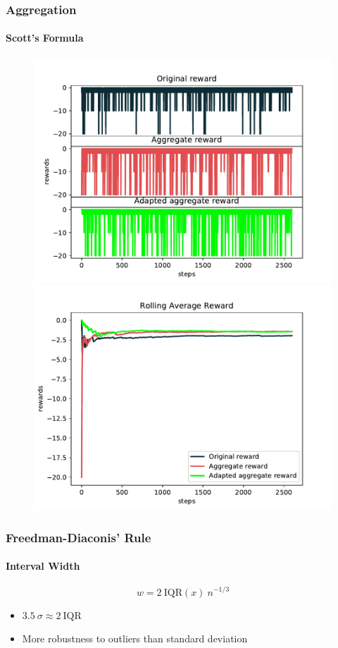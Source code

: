 \documentclass[mathserif]{beamer}
\begin{document}
    \begin{frame}
        \frametitle{Aggregation}
        \framesubtitle{Scott's Formula}

        \begin{figure}
            \label{fig:scott-rewards}
            \centering
            \includegraphics[width=0.46\columnwidth]{res/experiments/scott_steps_rewards.pdf}
            \qquad
            \includegraphics[width=0.46\columnwidth]{res/experiments/scott_rolling_rewards.pdf}
        \end{figure}

    \end{frame}


    \begin{frame}
        \frametitle{Freedman-Diaconis' Rule}
        \framesubtitle{Interval Width}

        \begin{equation}
            \label{eq:freedman-diaconis-rule}
            w = 2 \: \textrm{IQR}(x) \: n^{-1/3}
        \end{equation}

        \begin{itemize}
            \item $3.5 \: \sigma \approx 2 \: \textrm{IQR}$
            \item More robustness to outliers than standard deviation
        \end{itemize}
    \end{frame}
\end{document}
